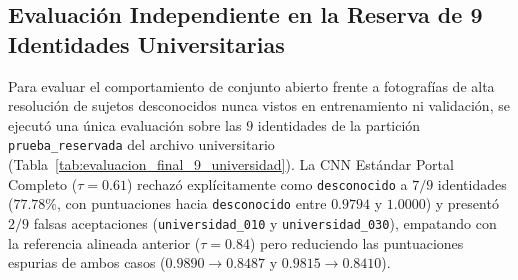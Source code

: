 \documentclass{article}
\begin{document}
\begin{table}[htbp]
\centering
\caption{Desglose por pose y matrices de confusión en la prueba histórica Sesión 05 (63 intentos autorizados).}
\label{tab:sesion05_poses_y_confusion}
\small
{}
\end{table}

\subsection{Evaluación Independiente en la Reserva de 9 Identidades Universitarias}
Para evaluar el comportamiento de conjunto abierto frente a fotografías de alta resolución de sujetos desconocidos nunca vistos en entrenamiento ni validación, se ejecutó una única evaluación sobre las $9$ identidades de la partición \texttt{prueba\_reservada} del archivo universitario (Tabla~\ref{tab:evaluacion_final_9_universidad}). La CNN Estándar Portal Completo ($\tau = 0.61$) rechazó explícitamente como \texttt{desconocido} a $7/9$ identidades ($77.78\%$, con puntuaciones hacia \texttt{desconocido} entre $0.9794$ y $1.0000$) y presentó $2/9$ falsas aceptaciones (\texttt{universidad\_010} y \texttt{universidad\_030}), empatando con la referencia alineada anterior ($\tau = 0.84$) pero reduciendo las puntuaciones espurias de ambos casos ($0.9890 \to 0.8487$ y $0.9815 \to 0.8410$).
\end{document}
